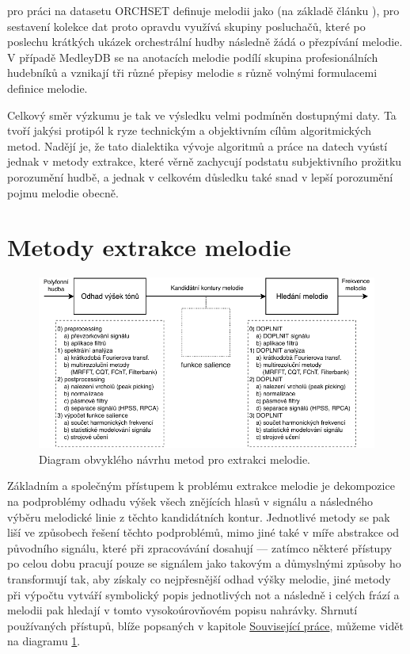 \cite{Bosch2016} pro práci na datasetu ORCHSET definuje melodii jako  (na základě článku \cite{Poliner2007}), pro sestavení kolekce dat proto opravdu využívá skupiny posluchačů, které po poslechu krátkých ukázek orchestrální hudby následně žádá o přezpívání melodie. V případě MedleyDB se na anotacích melodie podílí skupina profesionálních hudebníků a vznikají tři různé přepisy melodie s různě volnými formulacemi definice melodie.

Celkový směr výzkumu je tak ve výsledku velmi podmíněn dostupnými daty. Ta tvoří jakýsi protipól k ryze technickým a objektivním cílům algoritmických metod. Nadějí je, že tato dialektika vývoje algoritmů a práce na datech vyústí jednak v metody extrakce, které věrně zachycují podstatu subjektivního prožitku porozumění hudbě, a jednak v celkovém důsledku také snad v lepší porozumění pojmu melodie obecně.

\section{Metody extrakce melodie}

\begin{figure}[h]\centering
\includegraphics[width=\textwidth,height=\textheight,keepaspectratio]{../img/diagram_systemy_ME}
\caption{Diagram obvyklého návrhu metod pro extrakci melodie.}
\label{obr:diagram_systemy_ME}
\end{figure}

Základním a společným přístupem k problému extrakce melodie je dekompozice na podproblémy odhadu výšek všech znějících hlasů v signálu a následného výběru melodické linie z těchto kandidátních kontur. Jednotlivé metody se pak liší ve způsobech řešení těchto podproblémů, mimo jiné také v míře abstrakce od původního signálu, které při zpracovávání dosahují --- zatímco některé přístupy po celou dobu pracují pouze se signálem jako takovým a důmyslnými způsoby ho transformují tak, aby získaly co nejpřesnější odhad výšky melodie, jiné metody při výpočtu vytváří symbolický popis jednotlivých not a následně i celých frází a melodii pak hledají v tomto vysokoúrovňovém popisu nahrávky. Shrnutí používaných přístupů, blíže popsaných v kapitole \hyperref[chap:souvisejici]{Související práce}, můžeme vidět na diagramu \ref{obr:diagram_systemy_ME}.

